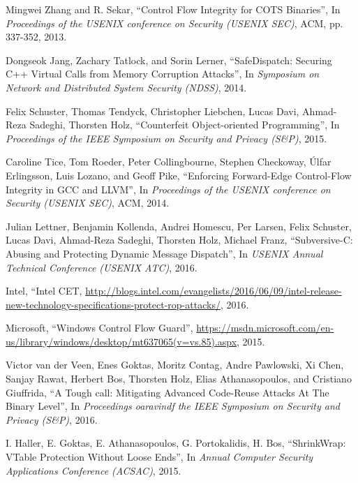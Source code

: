 \documentclass[11pt,a4paper,bibtotoc,idxtotoc,headsepline,footsepline,footexclude,BCOR20mm,DIV10]{scrbook}
\begin{document}
\begin{thebibliography}{50}



Mingwei Zhang and R. Sekar,
``{Control Flow Integrity for COTS Binaries}'', In
\emph{Proceedings of the USENIX conference on Security (USENIX SEC)}, ACM, pp. 337-352, 2013.

Dongseok Jang, Zachary Tatlock, and Sorin Lerner,
``{SafeDispatch: Securing C++ Virtual Calls from Memory Corruption Attacks}'', In
\emph{Symposium on Network and Distributed System Security (NDSS)}, 2014.

Felix Schuster, Thomas Tendyck, Christopher Liebchen, Lucas Davi, Ahmad-Reza Sadeghi, Thorsten Holz, 
``{Counterfeit Object-oriented Programming}'', In
\emph{Proceedings of the IEEE Symposium on Security and Privacy (S\&P)}, 2015.

Caroline Tice, Tom Roeder, Peter Collingbourne, Stephen Checkoway, 
Úlfar Erlingsson, Luis Lozano, and Geoff Pike, 
``{Enforcing Forward-Edge Control-Flow Integrity in GCC and LLVM}'', In
\emph{Proceedings of the USENIX conference on Security (USENIX SEC)}, ACM, 2014.

Julian Lettner, Benjamin Kollenda, Andrei Homescu, Per Larsen, Felix Schuster,
Lucas Davi, Ahmad-Reza Sadeghi, Thorsten Holz, Michael Franz,
``{Subversive-C: Abusing and Protecting Dynamic Message Dispatch}'', In
\emph{USENIX Annual Technical Conference (USENIX ATC)}, 2016.

Intel, ``{Intel CET},
\url{http://blogs.intel.com/evangelists/2016/06/09/intel-release-new-technology-specifications-protect-rop-attacks/}, 2016.

Microsoft,
``{Windows Control Flow Guard}'',
\url{https://msdn.microsoft.com/en-us/library/windows/desktop/mt637065(v=vs.85).aspx}, 2015.

Victor van der Veen, Enes Goktas, Moritz Contag, Andre Pawlowski, Xi Chen, Sanjay Rawat, 
Herbert Bos, Thorsten Holz, Elias Athanasopoulos, and Cristiano Giuffrida,
``{A Tough call: Mitigating Advanced Code-Reuse Attacks At The Binary Level}'', In
\emph{Proceedings oaravindf the IEEE Symposium on Security and Privacy (S\&P)}, 2016.

I. Haller, E. Goktas, E. Athanasopoulos, G. Portokalidis, H. Bos,
``{ShrinkWrap: VTable Protection Without Loose Ends}'', In
\emph{Annual Computer Security Applications Conference (ACSAC)}, 2015.


\end{thebibliography}
\end{document}
